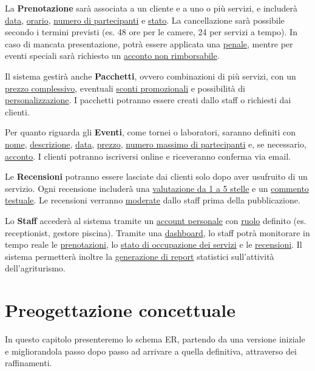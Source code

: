 \documentclass[a4paper,12pt]{report}
\begin{document}
La \textbf{Prenotazione} sarà associata a un cliente e a uno o più servizi, e includerà \underline{data}, \underline{orario}, \underline{numero di
	partecipanti} e \underline{stato}. La cancellazione sarà possibile secondo i termini previsti (es. 48 ore per le camere, 24 per servizi a tempo). In caso di
mancata presentazione, potrà essere applicata una \underline{penale}, mentre per eventi speciali sarà richiesto un \underline{acconto non rimborsabile}.

Il sistema gestirà anche \textbf{Pacchetti}, ovvero combinazioni \newline di più servizi, con un \underline{prezzo complessivo},
eventuali \underline{sconti promozionali} e possibilità \newline di \underline{personalizzazione}. I pacchetti potranno essere creati dallo staff o richiesti dai clienti.

Per quanto riguarda gli \textbf{Eventi}, come tornei o laboratori, saranno definiti con \underline{nome}, \newline \underline{descrizione}, \underline{data},
\underline{prezzo}, \underline{numero massimo di partecipanti} e, se necessario, \underline{acconto}. I clienti potranno iscriversi online e riceveranno conferma via email.

Le \textbf{Recensioni} potranno essere lasciate dai clienti solo dopo aver usufruito di un servizio. Ogni recensione includerà
una \underline{valutazione da 1 a 5 stelle} e un \underline{commento testuale}. Le recensioni verranno \underline{moderate} dallo staff prima della pubblicazione.

Lo \textbf{Staff} accederà al sistema tramite un \underline{account personale} con \underline{ruolo} definito (es. receptionist, gestore piscina). Tramite
una \underline{dashboard}, lo staff potrà monitorare in tempo reale le \underline{prenotazioni}, lo \underline{stato di occupazione dei servizi} e le
\underline{recensioni}. Il sistema permetterà inoltre la \underline{generazione di report} statistici sull'attività dell'agriturismo.


\chapter{Preogettazione concettuale}
In questo capitolo presenteremo lo schema ER, partendo da una versione iniziale e migliorandola passo dopo passo ad arrivare a quella
definitiva, attraverso dei raffinamenti.
\end{document}
